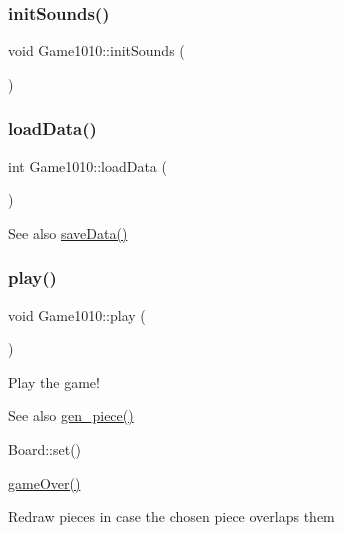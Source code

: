 \mbox{\label{class_game1010_a995a153a4f9639b989d605078f6c1ac2}} 
\subsubsection{\texorpdfstring{init\+Sounds()}{initSounds()}}
{\footnotesize\ttfamily void Game1010\+::init\+Sounds (\begin{DoxyParamCaption}{ }\end{DoxyParamCaption})\hspace{0.3cm}{\ttfamily [inline]}}

\mbox{\label{class_game1010_a3dbbf957de5309f1e7f3d6008f948176}} 
\subsubsection{\texorpdfstring{load\+Data()}{loadData()}}
{\footnotesize\ttfamily int Game1010\+::load\+Data (\begin{DoxyParamCaption}{ }\end{DoxyParamCaption})\hspace{0.3cm}{\ttfamily [inline]}}

\begin{DoxySeeAlso}{See also}
\mbox{\hyperlink{class_game1010_a72900d1043c4d40f953c584a9d9cb6c8}{save\+Data()}} 
\end{DoxySeeAlso}
\mbox{\label{class_game1010_afa18a3a81b8966417a228459a5bebf53}} 
\subsubsection{\texorpdfstring{play()}{play()}}
{\footnotesize\ttfamily void Game1010\+::play (\begin{DoxyParamCaption}{ }\end{DoxyParamCaption})\hspace{0.3cm}{\ttfamily [inline]}}



Play the game! 

\begin{DoxySeeAlso}{See also}
\mbox{\hyperlink{class_game1010_a9576170947a355682c922cb648432b9e}{gen\+\_\+piece()}} 

Board\+::set() 

\mbox{\hyperlink{class_game1010_a3bc296b7ba6bffeda3baceb1240190b6}{game\+Over()}} 
\end{DoxySeeAlso}
Redraw pieces in case the chosen piece overlaps them

